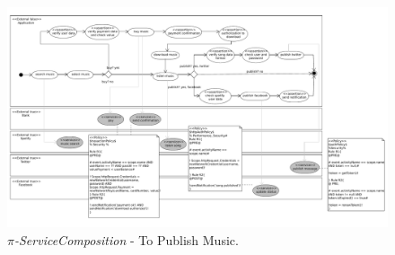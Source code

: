 \begin{landscape}
\begin{figure}[ht!]
\centering
\includegraphics[width=1.44\textwidth]{chapters/methodology/figs/runningExampleServiceComposition.pdf}
\caption{\textit{$\pi$-ServiceComposition} - To Publish Music.}
\label{figApp:servicecompositionPolicy}
\end{figure}
\end{landscape}